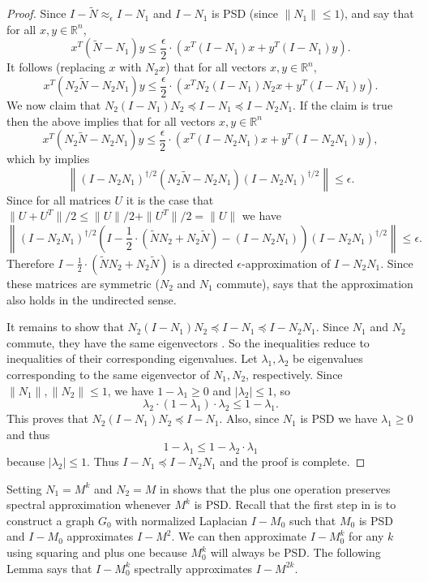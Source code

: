 \documentclass{toc}
\newcommand{\wt}{\widetilde}   %
\numberwithin{myalgctr}{section}
\theoremstyle{named}
\begin{document}
\begin{proof}
Since $I-\wt{N}\approx_{\epsilon} I-N_1$ and $I-N_1$ is PSD (since $\|N_1\|\leq 1$),  and  say that for all $x,y\in \mathbb{R}^n$,
 \[
x^T(\wt{N}-N_1)y\leq \frac{\epsilon}{2}\cdot (x^T(I-N_1)x +y^T(I-N_1)y).
\]
It follows (replacing $x$ with $N_2x$) that for all vectors $x,y\in \mathbb{R}^n$,
 \[
x^T(N_2\wt{N}-N_2N_1)y\leq \frac{\epsilon}{2}\cdot (x^TN_2(I-N_1)N_2x +y^T(I-N_1)y).
\]
We now claim that $N_2(I-N_1)N_2\preceq I-N_1\preceq I - N_2N_1$. If the claim is true then the above implies that for all vectors $x,y\in \mathbb{R}^n$
 \[
x^T(N_2\wt{N}-N_2N_1)y\leq \frac{\epsilon}{2}\cdot (x^T(I-N_2N_1)x +y^T(I-N_2N_1)y),
\]
which by  implies 
\[
\left\|(I-N_2N_1)^{\dagger/2}(N_2\wt{N}-N_2N_1)(I-N_2N_1)^{\dagger/2}\right\| \leq \epsilon.
\]
Since for all matrices $U$ it is the case that $\|U+U^T\|/2\leq \|U\|/2 +\|U^T\|/2 =\|U\|$ we have
\[
\left\|(I-N_2N_1)^{\dagger/2}\left(I-\frac{1}{2}\cdot(\wt{N}N_2 + N_2\wt{N})-(I-N_2N_1)\right)(I-N_2N_1)^{\dagger/2}\right\| \leq \epsilon.
\]
Therefore $I-\frac{1}{2}\cdot(\wt{N}N_2 + N_2\wt{N})$ is a directed $\epsilon$-approximation of $I-N_2N_1$. Since these matrices are symmetric ($N_2$ and $N_1$ commute),  says that the approximation also holds in the undirected sense. 

It remains to show that $N_2(I-N_1)N_2\preceq I-N_1\preceq I - N_2N_1$. Since $N_1$ and $N_2$ commute, they have the same eigenvectors \cite{horn1990matrix}. So the inequalities reduce to inequalities of their corresponding eigenvalues. Let $\lambda_1,\lambda_2$  be eigenvalues corresponding to the same eigenvector of $N_1,N_2$, respectively. Since $\|N_1\|,\|N_2\|\leq 1$, we have $1-\lambda_1\geq 0$ and $|\lambda_2|\leq 1$, so 
\[
\lambda_2\cdot(1-\lambda_1)\cdot\lambda_2\leq 1-\lambda_1.
\]
This proves that $N_2(I-N_1)N_2\preceq I-N_1$. Also, since $N_1$ is PSD we have $\lambda_1\geq 0$ and thus
\[
1-\lambda_1 \leq 1-\lambda_2\cdot\lambda_1
\]
because $|\lambda_2|\leq 1$. Thus $I-N_1\preceq I-N_2N_1$ and the proof is complete.
\end{proof}
Setting $N_1=M^k$ and $N_2=M$ in  shows that the plus one operation preserves spectral approximation whenever $M^k$ is PSD. Recall that the first step in  is to construct a graph $G_0$ with normalized Laplacian $I-M_0$ such that $M_0$ is PSD and $I-M_0$ approximates $I-M^2$. We can then approximate $I-M_0^{k}$ for any $k$ using squaring and plus one because $M_0^k$ will always be PSD. The following Lemma says that $I-M_0^k$ spectrally approximates $I-M^{2k}$.
\end{document}
